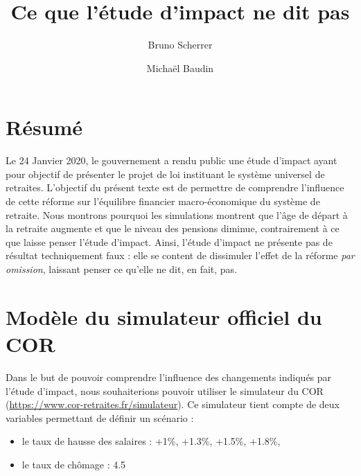 \documentclass[10pt]{article}
\title{Ce que l'étude d'impact ne dit pas}
\author{Bruno Scherrer}
\author{Michaël Baudin}
\begin{document}
\maketitle

\section{Résumé}

Le 24 Janvier 2020, le gouvernement a rendu public une 
étude d'impact ayant pour objectif de présenter le projet 
de loi instituant le système universel de retraites. 
L'objectif du présent texte est de permettre de comprendre 
l'influence de cette réforme sur l'équilibre financier macro-économique 
du système de retraite. 
Nous montrons pourquoi les simulations montrent que l'âge de départ à la 
retraite augmente et que le niveau des pensions diminue, contrairement à ce que laisse 
penser l'étude d'impact. 
Ainsi, l'étude d'impact ne présente pas de résultat techniquement faux : 
elle se content de dissimuler l'effet de la réforme \emph{par omission}, 
laissant penser ce qu'elle ne dit, en fait, pas. 

\section{Modèle du simulateur officiel du COR}

Dans le but de pouvoir comprendre l'influence des changements indiqués par 
l'étude d'impact, nous souhaiterions pouvoir utiliser le simulateur du COR 
(\url{https://www.cor-retraites.fr/simulateur}). 
Ce simulateur tient compte de deux variables permettant de définir un scénario :
\begin{itemize}
\item le taux de hausse des salaires : +1\%, +1.3\%, +1.5\%, +1.8\%, 
\item le taux de chômage : 4.5%
\end{itemize}
\end{document}
